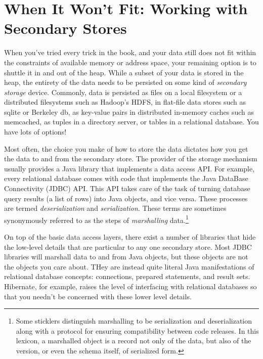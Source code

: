 \chapter{When It Won't Fit: Working with Secondary Stores}
\label{chapter:secondary-stores}

When you've tried every trick in the book, and your data still does not fit
within the constraints of available memory or address space, your remaining
option is to shuttle it in and out of the heap. While a subset of your data is
stored in the heap, the entirety of the data needs to be persisted on some kind
of \emph{secondary storage} device. Commonly, data is persisted as files on a
local filesystem or a distributed filesystems such as Hadoop's HDFS, in
flat-file data stores such as sqlite or Berkeley db, as key-value pairs in
distributed in-memory caches such as memcached, as tuples in a directory server,
or tables in a relational database. You have lots of options!

Most often, the choice you make of how to store the data dictates how you get
the data to and from the secondary store. The provider of the storage mechanism
usually provides a Java library that implements a data access API. For example,
every relational database comes with code that implements the Java DataBase
Connectivity (JDBC) API. This API takes care of the task of turning database
query results (a list of rows) into Java objects, and vice versa. These
processes are termed \emph{deserialization} and
\emph{serialization}. These terms are sometimes
synonymously referred to as the steps of \emph{marshalling} data.\footnote{Some
sticklers distinguish marshalling to be serialization and deserialization along
with a protocol for ensuring compatibility between code releases. In this
lexicon, a marshalled object is a record not only of the data, but also of the
version, or even the schema itself, of serialized form.}

On top of the basic data access layers, there exist a number of libraries that
hide the low-level details that are particular to any one secondary store. Most
JDBC libraries will marshall data to and from Java objects, but these objects
are not the objects you care about. THey are instead quite literal Java
manifestations of relational database concepts: connections, prepared
statements, and result sets. Hibernate, for example, raises the level of
interfacing with relational databases so that you needn't be concerned with
these lower level details.



